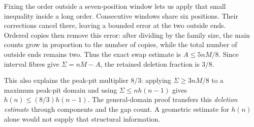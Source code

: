 Fixing the order outside a seven-position window lets us apply that
small inequality inside a long order. Consecutive windows share six
positions. Their corrections cancel there, leaving a bounded error
at the two outside ends. Ordered copies then remove this error:
after dividing by the family size, the main counts grow in proportion to the number of copies, while
the total number of outside ends remains two. Thus the exact swap
estimate is \(A\leq5nM/8\). Since interval fibres give
\(\Sigma=nM-A\), the retained deletion fraction is \(3/8\).

This also explains the peak-pit multiplier \(8/3\): applying
\(\Sigma\geq3nM/8\) to a maximum peak-pit domain and using
\(\Sigma\leq nh(n-1)\) gives \(h(n)\leq(8/3)h(n-1)\).
The general-domain proof transfers this \emph{deletion estimate}
through components and the gap count. A geometric estimate for
\(h(n)\) alone would not supply that structural information.

\clearpage
